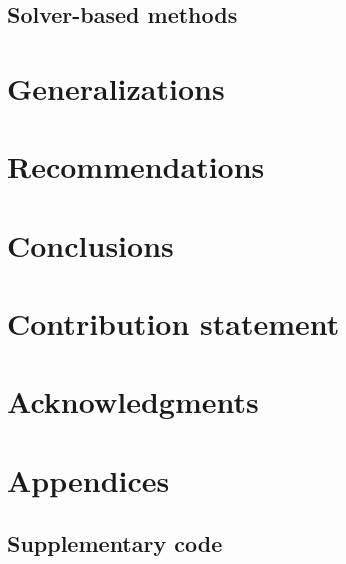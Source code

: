 \documentclass[11pt]{article}
\begin{document}
\subsection{Solver-based methods}
\label{section:solver-methods}


\section{Generalizations}
\label{section:generalization}


\section{Recommendations}
\label{section:recomendations}


\section{Conclusions}


% 

\mbox{}
\vfill
\section*{Contribution statement}

\section*{Acknowledgments}


\newpage
\appendix
\section*{Appendices}
\renewcommand{\thesubsection}{\Alph{subsection}}

% 
% 
\subsection{Supplementary code}

\label{appedix:code}



\newpage
\printbibliography[heading=bibintoc, title={References}]
\end{document}
